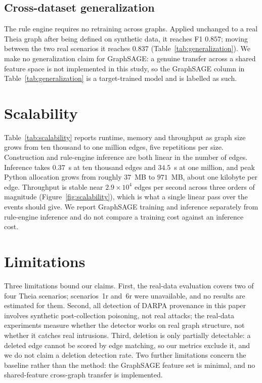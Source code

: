 \documentclass[conference]{IEEEtran}
\begin{document}
\subsection{Cross-dataset generalization}
The rule engine requires no retraining across graphs. Applied unchanged to a
real Theia graph after being defined on synthetic data, it reaches F1 $0.857$;
moving between the two real scenarios it reaches $0.837$ (Table~\ref{tab:generalization}).
We make no generalization claim for GraphSAGE: a genuine transfer across a
shared feature space is not implemented in this study, so the GraphSAGE column
in Table~\ref{tab:generalization} is a target-trained model and is labelled as such.

\section{Scalability}
Table~\ref{tab:scalability} reports runtime, memory and throughput as graph size
grows from ten thousand to one million edges, five repetitions per size.
Construction and rule-engine inference are both linear in the number of edges.
Inference takes $0.37$~s at ten thousand edges and $34.5$~s at one million, and
peak Python allocation grows from roughly $37$~MB to $971$~MB, about one
kilobyte per edge. Throughput is stable near $2.9\times10^{4}$ edges per second
across three orders of magnitude (Figure~\ref{fig:scalability}), which is what a
single linear pass over the events should give. We report GraphSAGE training and
inference separately from rule-engine inference and do not compare a training
cost against an inference cost.

\section{Limitations}
Three limitations bound our claims. First, the real-data evaluation covers two
of four Theia scenarios; scenarios~1r and~6r were unavailable, and no results
are estimated for them. Second, all detection of DARPA provenance in this paper
involves synthetic post-collection poisoning, not real attacks; the real-data
experiments measure whether the detector works on real graph structure, not
whether it catches real intrusions. Third, deletion is only partially
detectable: a deleted edge cannot be scored by edge matching, so our metrics
exclude it, and we do not claim a deletion detection rate. Two further
limitations concern the baseline rather than the method: the GraphSAGE feature
set is minimal, and no shared-feature cross-graph transfer is implemented.
\end{document}
